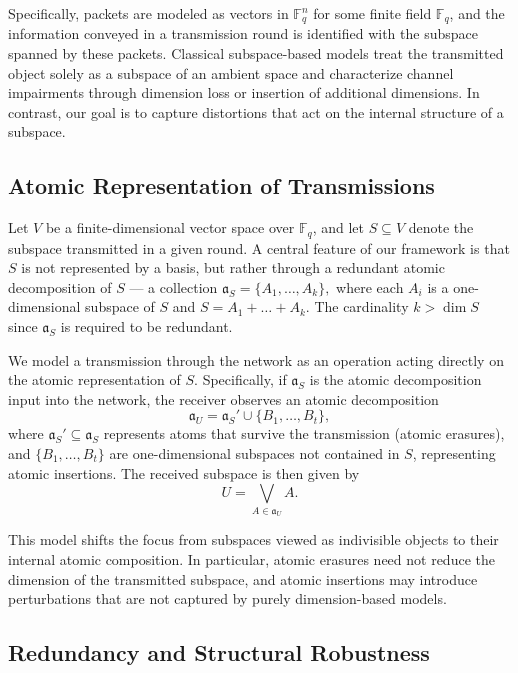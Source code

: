\documentclass{svproc}
\begin{document}
Specifically, packets are modeled as vectors in $\mathbb{F}_q^n$ for some finite
field $\mathbb{F}_q$, and the information conveyed in a transmission round is
identified with the subspace spanned by these packets.
Classical subspace-based models treat the transmitted object solely as a subspace
of an ambient space and characterize channel impairments through dimension loss
or insertion of additional dimensions.
In contrast, our goal is to capture distortions that act on the internal structure
of a subspace.

\subsection{Atomic Representation of Transmissions}

Let $V$ be a finite-dimensional vector space over $\mathbb{F}_q$, and let
$S \subseteq V$ denote the subspace transmitted in a given round.
A central feature of our framework is that $S$ is not represented by a basis,
but rather through a redundant atomic decomposition of $S$ ---
a collection 
\(
\mathfrak{a}_S = \{A_1, \dots, A_k\},
\)
where each $A_i$ is a one-dimensional subspace of $S$ and
\(
S = A_1 + \dots + A_k.
\)
The cardinality $k>\dim S$ since $\mathfrak{a}_S$ is required to  be redundant.

We model a transmission through the network as an operation acting directly on
the atomic representation of $S$.
Specifically, if $\mathfrak{a}_S$ is the atomic decomposition input into the
network, the receiver observes an atomic decomposition
\[
\mathfrak{a}_U = \mathfrak{a}_S' \cup \{B_1, \dots, B_t\},
\]
where $\mathfrak{a}_S' \subseteq \mathfrak{a}_S$ represents atoms that survive
the transmission (atomic erasures), and $\{B_1, \dots, B_t\}$ are one-dimensional
subspaces not contained in $S$, representing atomic insertions.
The received subspace is then given by
\[
U = \bigvee_{A \in \mathfrak{a}_U} A.
\]

This model shifts the focus from subspaces viewed as indivisible objects to their
internal atomic composition.
In particular, atomic erasures need not reduce the dimension of the transmitted
subspace, and atomic insertions may introduce perturbations that are
not captured by purely dimension-based models.

\subsection{Redundancy and Structural Robustness}
\end{document}
